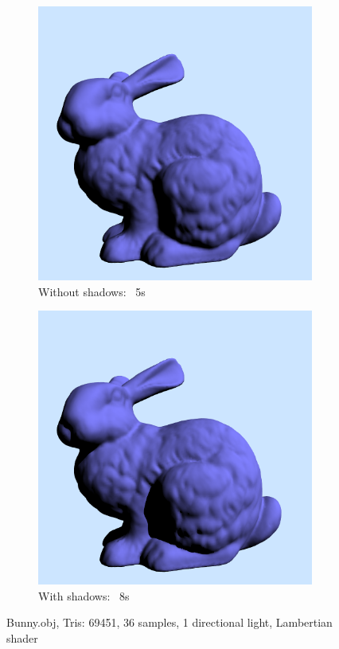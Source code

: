 \documentclass[a4paper]{article}
\begin{document}
\begin{figure}
	\centering
	\begin{subfigure}[b]{0.4\textwidth}
		\includegraphics[width=\textwidth]{week1/bunny_noshadows.png}
		\caption{Without shadows: ~5s}
		\label{fig:bunnynoshadows}
	\end{subfigure}
	\begin{subfigure}[b]{0.4\textwidth}
		\includegraphics[width=\textwidth]{week1/bunny_shadowed.png}
		\caption{With shadows: ~8s}
		\label{fig:bunnyshadowed}
	\end{subfigure}
	\caption{Bunny.obj, Tris: 69451, 36 samples, 1 directional light, Lambertian shader}
\end{figure}
\end{document}
